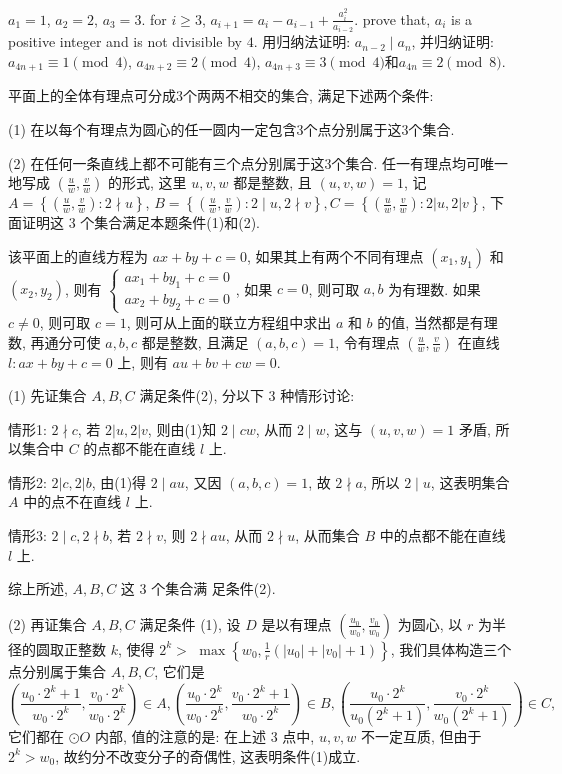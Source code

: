\bq{}{}
$a_1=1$, $a_2=2$, $a_3=3$. for $i\ge 3$, $a_{i+1}=a_i-a_{i-1}+\frac{a_i^2}{a_{i-2}}$.
prove that, $a_i$ is a positive integer and is not divisible by $4$.
\eq
\ba
用归纳法证明: $a_{n-2}\mid a_n$, 并归纳证明: $a_{4n+1}\equiv 1\pmod{4}$, $a_{4n+2}\equiv 2\pmod{4}$, $a_{4n+3}\equiv 3\pmod{4}$和$a_{4n}\equiv 2\pmod{8}$.
\ea

平面上的全体有理点可分成$3$个两两不相交的集合, 满足下述两个条件:

(1) 在以每个有理点为圆心的任一圆内一定包含$3$个点分别属于这$3$个集合.

(2) 在任何一条直线上都不可能有三个点分别属于这$3$个集合.
\eq
\ba
任一有理点均可唯一地写成 $\left(\frac{u}{w}, \frac{v}{w}\right)$ 的形式, 这里 $u, v, w$ 都是整数, 且 $(u, v, w)=1$, 记 $A=\left\{\left(\frac{u}{w}, \frac{v}{w}\right): 2 \nmid u\right\}$, $B=\left\{\left(\frac{u}{w}, \frac{v}{w}\right): 2 \mid u, 2 \nmid v\right\}, C=\left\{\left(\frac{u}{w}, \frac{v}{w}\right): 2|u, 2| v\right\}$, 下面证明这 3 个集合满足本题条件(1)和(2).

该平面上的直线方程为 $a x+b y+c=0$, 如果其上有两个不同有理点 $\left(x_1, y_1\right)$ 和 $\left(x_2, y_2\right)$, 则有 $\left\{\begin{array}{l}a x_1+b y_1+c=0 \\ a x_2+b y_2+c=0\end{array}\right.$, 如果 $c=0$, 则可取 $a, b$ 为有理数. 如果 $c \neq 0$, 则可取 $c=1$, 则可从上面的联立方程组中求出 $a$ 和 $b$ 的值, 当然都是有理数, 再通分可使 $a, b, c$ 都是整数, 且满足 $(a, b, c)=1$, 令有理点 $\left(\frac{u}{w}, \frac{v}{w}\right)$ 在直线 $l: a x+b y+c=0$ 上, 则有 $a u+b v+c w=0$.

(1) 先证集合 $A, B, C$ 满足条件(2), 分以下 3 种情形讨论:

情形1: $2 \nmid c$, 若 $2|u, 2| v$, 则由(1)知 $2 \mid c w$, 从而 $2 \mid w$, 这与 $(u, v, w)=1$ 矛盾, 所以集合中 $C$ 的点都不能在直线 $l$ 上. 

情形2: $2|c, 2| b$, 由(1)得 $2 \mid a u$, 又因 $(a, b, c)=1$, 故 $2 \nmid a$, 所以 $2 \mid u$, 这表明集合 $A$ 中的点不在直线 $l$ 上.

情形3: $2 \mid c, 2 \nmid b$, 若 $2 \nmid v$, 则 $2 \nmid a u$, 从而 $2 \nmid u$, 从而集合 $B$ 中的点都不能在直线 $l$ 上. 

综上所述, $A, B, C$ 这 3 个集合满 足条件(2).

(2) 再证集合 $A, B, C$ 满足条件 (1), 设 $D$ 是以有理点 $\left(\frac{u_0}{w_0}, \frac{v_0}{w_0}\right)$ 为圆心, 以 $r$ 为半径的圆取正整数 $k$, 使得 $2^k>$ $\max \left\{w_0, \frac{1}{r}\left(\left|u_0\right|+\left|v_0\right|+1\right)\right\}$, 我们具体构造三个点分别属于集合 $A, B, C$, 它们是
$$
\left(\frac{u_0 \cdot 2^k+1}{w_0 \cdot 2^k}, \frac{v_0 \cdot 2^k}{w_0 \cdot 2^k}\right) \in A,\left(\frac{u_0 \cdot 2^k}{w_0 \cdot 2^k}, \frac{v_0 \cdot 2^k+1}{w_0 \cdot 2^k}\right) \in B,\left(\frac{u_0 \cdot 2^k}{u_0\left(2^k+1\right)}, \frac{v_0 \cdot 2^k}{w_0\left(2^k+1\right)}\right) \in C,
$$
它们都在 $\odot O$ 内部, 值的注意的是: 在上述 3 点中, $u, v, w$ 不一定互质, 但由于 $2^k>w_0$, 故约分不改变分子的奇偶性, 这表明条件(1)成立.
\ea